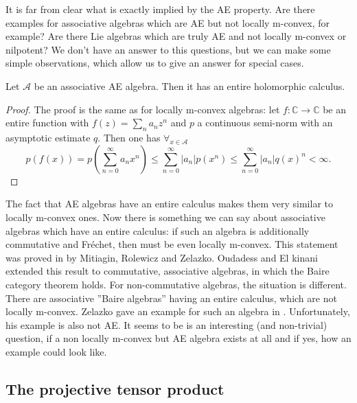 		
It is far from clear what is exactly implied by the AE property. 
Are there examples for associative algebras which are AE but not locally 
m-convex, for example? Are there Lie algebras which are truly AE and not 
locally m-convex or nilpotent? We don't have an answer to this questions,
but we can make some simple observations, which allow us to give an answer
for special cases.
\begin{proposition}
	Let $\mathcal{A}$ be an associative AE algebra. Then it has an
	entire holomorphic calculus.
\end{proposition}
\begin{proof}
	The proof is the same as for locally m-convex algebras: let 
	$f \colon \mathbb{C} \longrightarrow \mathbb{C}$ be an entire 
	function with $f(z) = \sum_n a_n z^n$ and $p$
	a continuous semi-norm with an asymptotic estimate $q$.
	Then one has $\forall_{x \in \mathcal{A}}$
	\begin{equation*}
		p(f(x))
		=
		p \left(
			\sum\limits_{n=0}^{\infty}
			a_n x^n
		\right)
		\leq
		\sum\limits_{n=0}^{\infty}
		|a_n| 
		p \left( x^n \right)
		\leq
		\sum\limits_{n=0}^{\infty}
		|a_n| q(x)^n
		<
		\infty.
	\end{equation*}
\end{proof}
\begin{remark}
	The fact that AE algebras have an entire calculus makes them very similar 
	to locally m-convex ones.
	Now there is something we can say about associative algebras which have an 
	entire calculus: if such an algebra is additionally commutative and 
	Fr\'echet, then must be even locally m-convex. This statement was proved 
	in \cite{MRZ:EntireCalculus:1962} by Mitiagin, Rolewicz and 
	Zelazko. Oudadess and El kinani extended this result to commutative, 
	associative algebras, in which the Baire category theorem holds.
	For non-commutative algebras, the situation is different. There are 
	associative ''Baire algebras'' having an entire calculus, which are not 
	locally m-convex. Zelazko gave an example for such an algebra in 
	\cite{Zelazko:EntButNotLMC:1998}. Unfortunately, his example is also not 
	AE. It seems to be is an interesting (and non-trivial) question, 
	if a non locally m-convex but AE algebra exists at all and if yes, 
	how an example could look like.
\end{remark}



\subsection{The projective tensor product}

